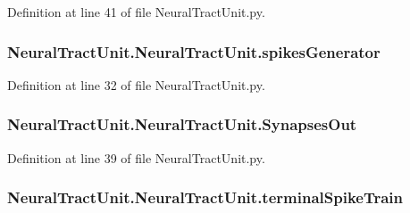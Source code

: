Definition at line 41 of file Neural\-Tract\-Unit.\-py.

\hypertarget{class_neural_tract_unit_1_1_neural_tract_unit_a57cbb130e004fb3f7ee8d8a540f7dff0}{
\subsubsection[{spikes\-Generator}]{\setlength{\rightskip}{0pt plus 5cm}Neural\-Tract\-Unit.\-Neural\-Tract\-Unit.\-spikes\-Generator}}\label{class_neural_tract_unit_1_1_neural_tract_unit_a57cbb130e004fb3f7ee8d8a540f7dff0}


Definition at line 32 of file Neural\-Tract\-Unit.\-py.

\hypertarget{class_neural_tract_unit_1_1_neural_tract_unit_a740d2cfa17ad57c7dbd40fbafc654b95}{
\subsubsection[{Synapses\-Out}]{\setlength{\rightskip}{0pt plus 5cm}Neural\-Tract\-Unit.\-Neural\-Tract\-Unit.\-Synapses\-Out}}\label{class_neural_tract_unit_1_1_neural_tract_unit_a740d2cfa17ad57c7dbd40fbafc654b95}


Definition at line 39 of file Neural\-Tract\-Unit.\-py.

\hypertarget{class_neural_tract_unit_1_1_neural_tract_unit_ac34c86235329e753e8cfdfcc1e24c53f}{
\subsubsection[{terminal\-Spike\-Train}]{\setlength{\rightskip}{0pt plus 5cm}Neural\-Tract\-Unit.\-Neural\-Tract\-Unit.\-terminal\-Spike\-Train}}\label{class_neural_tract_unit_1_1_neural_tract_unit_ac34c86235329e753e8cfdfcc1e24c53f}


